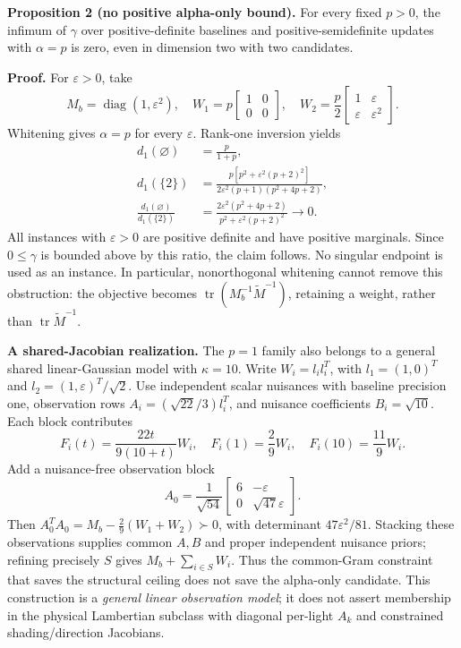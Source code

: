\textbf{Proposition 2 (no positive alpha-only bound).} For every fixed $p>0$, the infimum of $\gamma$ over positive-definite baselines and positive-semidefinite updates with $\alpha=p$ is zero, even in dimension two with two candidates.

\textbf{Proof.} For $\varepsilon>0$, take
\begin{equation}
M_b=\operatorname{diag}(1,\varepsilon^2),\quad
W_1=p\begin{bmatrix}1&0\\0&0\end{bmatrix},\quad
W_2=\frac p2\begin{bmatrix}1&\varepsilon\\\varepsilon&\varepsilon^2\end{bmatrix}.
\end{equation}
Whitening gives $\alpha=p$ for every $\varepsilon$. Rank-one inversion yields
\begin{align}
d_1(\varnothing)&=\frac{p}{1+p},\\
d_1(\{2\})&=\frac{p[p^2+\varepsilon^2(p+2)^2]}
{2\varepsilon^2(p+1)(p^2+4p+2)},\\
\frac{d_1(\varnothing)}{d_1(\{2\})}
&=\frac{2\varepsilon^2(p^2+4p+2)}{p^2+\varepsilon^2(p+2)^2}\longrightarrow0.
\label{eq:gamma-impossibility-family}
\end{align}
All instances with $\varepsilon>0$ are positive definite and have positive marginals. Since $0\leq\gamma$ is bounded above by this ratio, the claim follows. No singular endpoint is used as an instance. In particular, nonorthogonal whitening cannot remove this obstruction: the objective becomes $\operatorname{tr}(M_b^{-1}\widetilde M^{-1})$, retaining a weight, rather than $\operatorname{tr}\widetilde M^{-1}$.

\textbf{A shared-Jacobian realization.} The $p=1$ family also belongs to a general shared linear-Gaussian model with $\kappa=10$. Write $W_i=l_il_i^T$, with $l_1=(1,0)^T$ and $l_2=(1,\varepsilon)^T/\sqrt2$. Use independent scalar nuisances with baseline precision one, observation rows $A_i=(\sqrt{22}/3)l_i^T$, and nuisance coefficients $B_i=\sqrt{10}$. Each block contributes
\begin{equation}
F_i(t)=\frac{22t}{9(10+t)}W_i,
\quad F_i(1)=\frac29W_i,\quad F_i(10)=\frac{11}{9}W_i.
\end{equation}
Add a nuisance-free observation block
\begin{equation}
A_0=\frac1{\sqrt{54}}\begin{bmatrix}6&-\varepsilon\\0&\sqrt{47}\varepsilon\end{bmatrix}.
\end{equation}
Then $A_0^TA_0=M_b-\frac29(W_1+W_2)\succ0$, with determinant $47\varepsilon^2/81$. Stacking these observations supplies common $A,B$ and proper independent nuisance priors; refining precisely $S$ gives $M_b+\sum_{i\in S}W_i$. Thus the common-Gram constraint that saves the structural ceiling does not save the alpha-only candidate. This construction is a \emph{general linear observation model}; it does not assert membership in the physical Lambertian subclass with diagonal per-light $A_k$ and constrained shading/direction Jacobians.

